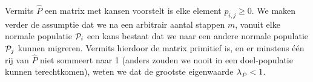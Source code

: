 \paragraph{}
Vermits $\hat{P}$ een matrix met kansen voorstelt is elke element $\hat{p}_{i,j}\geq 0$. We maken verder de assumptie dat we na een arbitrair aantal stappen $m$, vanuit elke normale populatie $\calP_i$ een kans bestaat dat we naar een andere normale populatie $\calP_j$ kunnen migreren. Vermits hierdoor de matrix primitief is, en er minstens \'e\'en rij van $\hat{P}$ niet sommeert naar 1 (anders zouden we nooit in een doel-populatie kunnen terechtkomen), weten we dat de grootste eigenwaarde $\ev[\hat{P}]<1$.

